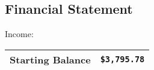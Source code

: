 \subsection{Financial Statement}

Income:

\begin{tabular}{|c|c|}
\hline
Starting Balance & \texttt{\$3,795.78} \\
\hline
\end{tabular}